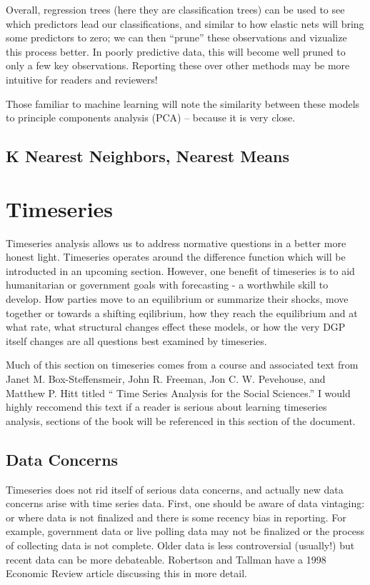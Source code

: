 \documentclass[12pt]{article}\usepackage[]{graphicx}\usepackage[]{color}
\begin{document}
\begin{flushleft}
Overall, regression trees (here they are classification trees) can be used to see which predictors lead our classifications, and similar to how elastic nets will bring some predictors to zero; we can then ``prune'' these observations and vizualize this process better. In poorly predictive data, this will become well pruned to only a few key observations. Reporting these over other methods may be more intuitive for readers and reviewers!

Those familiar to machine learning will note the similarity between these models to principle components analysis (PCA) -- because it is very close.



\subsection{K Nearest Neighbors, Nearest Means}




\clearpage
\section{Timeseries}

Timeseries analysis allows us to address normative questions in a better more honest light. Timeseries operates around the difference function which will be introducted in an upcoming section. However, one benefit of timeseries is to aid humanitarian or government goals with forecasting - a worthwhile skill to develop. How parties move to an equilibrium or summarize their shocks, move together or towards a shifting eqilibrium, how they reach the equilibrium and at what rate, what structural changes effect these models, or how the very DGP itself changes are all questions best examined by timeseries.

Much of this section on timeseries comes from a course and associated text from Janet M. Box-Steffensmeir, John R. Freeman, Jon C. W. Pevehouse, and Matthew P. Hitt titled `` Time Series Analysis for the Social Sciences.'' I would highly reccomend this text if a reader is serious about learning timeseries analysis, sections of the book will be referenced in this section of the document.

\subsection{Data Concerns}

Timeseries does not rid itself of serious data concerns, and actually new data concerns arise with time series data. First, one should be aware of data vintaging: or where data is not finalized and there is some recency bias in reporting. For example, government data or live polling data may not be finalized or the process of collecting data is not complete. Older data is less controversial (usually!) but recent data can be more debateable. Robertson and Tallman have a 1998 Economic Review article discussing this in more detail.  


\end{flushleft}
\end{document}
